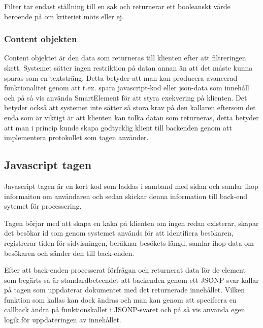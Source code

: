Filter tar endast ställning till en sak och returnerar ett booleanskt värde beroende på om kriteriet möts eller ej.

\subsubsection{Content objekten}

Content objektet är den data som returneras till klienten efter att filtreringen skett. Systemet sätter ingen restriktion på datan annan än att det måste kunna sparas som en textsträng. Detta betyder att man kan producera avancerad funktionalitet genom att t.ex. spara javascript-kod eller json-data som innehåll och på så vis använda SmartElement för att styra exekvering på klienten. Det betyder också att systemet inte sätter så stora krav på den kallaren eftersom det enda som är viktigt är att klienten kan tolka datan som returneras, detta betyder att man i princip kunde skapa godtycklig klient till backenden genom att implementera protokollet som tagen använder.

\subsection{Javascript tagen}

Javascript tagen är en kort kod som laddas i samband med sidan och samlar ihop informaiton om användaren och sedan skickar denna information till back-end sytemet för processering.

Tagen börjar med att skapa en kaka på klienten om ingen redan existerar, skapar det besökar id som genom systemet används för att identifiera besökaren, registrerar tiden för sidvisningen, beräknar besökets längd, samlar ihop data om besökaren och sänder den till back-enden.

Efter att back-enden processerat förfrågan och returnerat data för de element som begärts så är standardbeteendet att backenden genom ett JSONP-svar kallar på tagen som uppdaterar dokumentet med det returnerade innehållet. Vilken funktion som kallas kan dock ändras och man kan genom att specifcera en callback ändra på funktionskallet i JSONP-svaret och på så vis använda egen logik för uppdateringen av innehållet.

